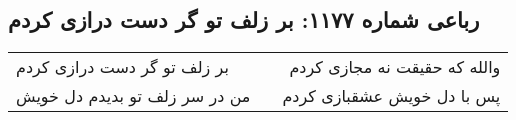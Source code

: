 \begin{center}
\section*{رباعی شماره ۱۱۷۷: بر زلف تو گر دست درازی کردم}
\label{sec:1177}
\begin{longtable}{l p{0.5cm} r}
بر زلف تو گر دست درازی کردم
&&
والله که حقیقت نه مجازی کردم
\\
من در سر زلف تو بدیدم دل خویش
&&
پس با دل خویش عشقبازی کردم
\\
\end{longtable}
\end{center}
